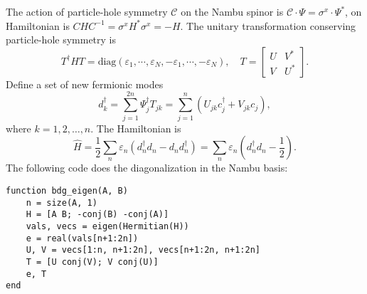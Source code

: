 \documentclass{SciPost}
\begin{document}
The action of particle-hole symmetry $\mathcal C$ on the Nambu spinor is $\mathcal C \cdot \Psi = \sigma^x \cdot\Psi^*$, on Hamiltonian is $C H C^{-1} = \sigma^x H^* \sigma^x = -H$. The unitary transformation conserving particle-hole symmetry is
\begin{equation}
	T^\dagger H T = \mathrm{diag}(\varepsilon_1,\cdots,\varepsilon_N,-\varepsilon_1,\cdots,-\varepsilon_N),\quad
	T = \begin{bmatrix}
		U & V^* \\ V & U^*
	\end{bmatrix}.
\end{equation}
Define a set of new fermionic modes
\begin{equation}
	d_k^\dagger = \sum_{j=1}^{2n} \Psi_j^\dagger T_{jk}
	= \sum_{j=1}^n (U_{jk} c_j^\dagger + V_{jk} c_j),
\end{equation}
where $k = 1,2,\dots,n$.
The Hamiltonian is
\begin{equation}
	\hat H = \frac{1}{2} \sum_n \varepsilon_n (d_n^\dagger d_n- d_n d_n^\dagger) 
	= \sum_n \varepsilon_n\left(d_n^\dagger d_n-\frac{1}{2}\right).
\end{equation}
The following code does the diagonalization in the Nambu basis:
\begin{lstlisting}
function bdg_eigen(A, B)
	n = size(A, 1)
	H = [A B; -conj(B) -conj(A)]
	vals, vecs = eigen(Hermitian(H))
	e = real(vals[n+1:2n])
	U, V = vecs[1:n, n+1:2n], vecs[n+1:2n, n+1:2n]
	T = [U conj(V); V conj(U)]
	e, T
end
\end{lstlisting}
\end{document}
